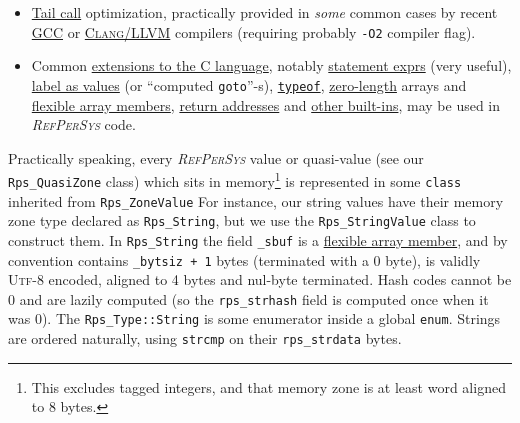 \documentclass[11pt,a4paper,svgnames]{article}
\newcommand{\RefPerSys}{{\textit{\textsc{RefPerSys}}}}
\begin{document}
\begin{itemize}
    \item \href{https://en.wikipedia.org/wiki/Tail_call}{Tail call}
      optimization, practically provided in \emph{some} common cases
      by recent \href{http://gcc.gnu.org/}{\textsc{GCC}} or
      \href{http://clang.llvm.org/}{\textsc{Clang/LLVM}} compilers
      (requiring probably \texttt{-O2} compiler flag).

      \item Common
        \href{https://gcc.gnu.org/onlinedocs/gcc/C-Extensions.html}{extensions
          to the C language}, notably
        \href{https://gcc.gnu.org/onlinedocs/gcc/Statement-Exprs.html}{statement
          exprs} (very useful),
        \href{https://gcc.gnu.org/onlinedocs/gcc/Labels-as-Values.html}{label
          as values} (or ``computed \texttt{goto}''-s),
        \href{https://gcc.gnu.org/onlinedocs/gcc/Typeof.html#Typeof}{\texttt{typeof}},
        \href{https://gcc.gnu.org/onlinedocs/gcc/Zero-Length.html}{zero-length}
        arrays and
        \href{https://en.wikipedia.org/wiki/Flexible\_array\_member}{flexible
          array members},
        \href{https://gcc.gnu.org/onlinedocs/gcc/Return-Address.html}{return
          addresses} and
        \href{https://gcc.gnu.org/onlinedocs/gcc/Other-Builtins.html}{other
          built-ins}, may be used in {\RefPerSys} code.
\end{itemize}

\smallskip

Practically speaking, every {\RefPerSys} value or quasi-value (see our
\texttt{Rps\_QuasiZone} class) which sits in memory\footnote{This
excludes tagged integers, and that memory zone is at least word
aligned to 8 bytes.} is represented in some \texttt{class} inherited
from \texttt{Rps\_ZoneValue} For instance, our string values have
their memory zone type declared as \texttt{Rps\_String}, but we use
the \texttt{Rps\_StringValue} class to construct them. In
\texttt{Rps\_String} the field \texttt{\_sbuf} is a
\href{https://en.wikipedia.org/wiki/Flexible_array_member}{flexible
  array member}, and by convention contains \texttt{\_bytsiz + 1}
bytes (terminated with a 0 byte), is validly \textsc{Utf-8} encoded,
aligned to 4 bytes and nul-byte terminated. Hash codes cannot be 0 and
are lazily computed (so the \texttt{rps\_strhash} field is computed
once when it was 0). The \texttt{Rps\_Type::String} is some enumerator
inside a global \texttt{enum}. Strings are ordered naturally, using
\texttt{strcmp} on their \texttt{rps\_strdata} bytes.


\smallskip
\end{document}
